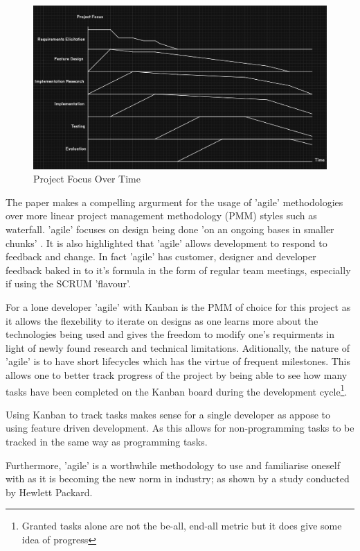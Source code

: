   \begin{figure}
    \begin{center}
      \includegraphics[scale=0.4]{Images/ProjectFocus2}
      \caption{Project Focus Over Time}
      \label{fig:project focus}
    \end{center}
  \end{figure}

  The paper \citep{Highsmith2001} makes a compelling argurment for the usage of 'agile' methodologies over more linear project management methodology (PMM) styles such as waterfall. 'agile' focuses on design being done 'on an ongoing bases in smaller chunks' \citep{Highsmith2001}. It is also highlighted that 'agile' allows development to respond to feedback and change. In fact 'agile' has customer, designer and developer feedback baked in to it's formula in the form of regular team meetings, especially if using the SCRUM 'flavour'.
  \par
  For a lone developer 'agile' with Kanban is the PMM of choice for this project as it allows the flexebility to iterate on designs as one learns more about the technologies being used and gives the freedom to modify one's requirments in light of newly found research and technical limitations. Aditionally, the nature of 'agile' is to have short lifecycles which has the virtue of frequent milestones. This allows one to better track progress of the project by being able to see how many tasks have been completed on the Kanban board during the development cycle\footnote[4]{Granted tasks alone are not the be-all, end-all metric but it does give some idea of progress}.
  \par
  Using Kanban to track tasks makes sense for a single developer as appose to using feature driven development. As this allows for non-programming tasks to be tracked in the same way as programming tasks.
  \par
  Furthermore, 'agile' is a worthwhile methodology to use and familiarise oneself with as it is becoming the new norm in industry; as shown by a study conducted by Hewlett Packard.

